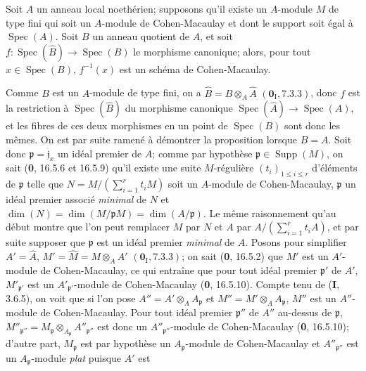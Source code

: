 \begin{proposition}[6.3.8]
\label{IV.2.s6.3.8-fr}
Soit $A$ un anneau local noethérien; supposons qu'il existe un $A$-module $M$
de type fini qui soit un $A$-module de Cohen-Macaulay et dont le support soit
égal à $\operatorname{Spec}(A)$. Soit $B$ un anneau quotient de $A$, et soit
$f:\operatorname{Spec}(\widehat B)\to\operatorname{Spec}(B)$ le morphisme
canonique; alors, pour tout $x\in\operatorname{Spec}(B)$, $f^{-1}(x)$ est un
schéma de Cohen-Macaulay.
\end{proposition}

Comme $B$ est un $A$-module de type fini, on a
$\widehat B=B\otimes_A\widehat A$ $(\mathbf{0}_{\mathrm I}, 7.3.3)$, donc $f$ est la
restriction à $\operatorname{Spec}(\widehat B)$ du morphisme canonique
$\operatorname{Spec}(\widehat A)\to\operatorname{Spec}(A)$, et les fibres de
ces deux morphismes en un point de $\operatorname{Spec}(B)$ sont donc les
mêmes. On est par suite ramené à démontrer la proposition lorsque $B=A$.
Soit donc $\mathfrak p=\mathfrak j_x$ un idéal premier de $A$; comme par
hypothèse $\mathfrak p\in\operatorname{Supp}(M)$, on sait (\textbf{0}, 16.5.6 et
16.5.9) qu'il existe une suite $M$-régulière $(t_i)_{1\leq i\leq r}$
d'éléments de $\mathfrak p$ telle que
$N=M/(\sum_{i=1}^{r}t_iM)$
soit un $A$-module de Cohen-Macaulay, $\mathfrak p$ un idéal premier associé
\emph{minimal} de $N$ et
$\dim(N)=\dim(M/\mathfrak pM)=\dim(A/\mathfrak p)$. Le même raisonnement
qu'au début montre que l'on peut remplacer $M$ par $N$ et $A$ par
$A/(\sum_{i=1}^{r}t_iA)$, et par suite supposer que $\mathfrak p$ est un
idéal premier \emph{minimal} de $A$. Posons pour simplifier
$A'=\widehat A$, $M'=\widehat M=M\otimes_AA'$ $(\mathbf{0}_{\mathrm I}, 7.3.3)$; on
sait (\textbf{0}, 16.5.2) que $M'$ est un $A'$-module de Cohen-Macaulay, ce qui entraîne
que pour tout idéal premier $\mathfrak p'$ de $A'$,
$M'_{\mathfrak p'}$ est un $A'_{\mathfrak p'}$-module de Cohen-Macaulay
(\textbf{0}, 16.5.10). Compte tenu de (\textbf{I}, 3.6.5), on voit que si l'on pose
$A''=A'\otimes_AA_{\mathfrak p}$ et
$M''=M'\otimes_AA_{\mathfrak p}$, $M''$ est un $A''$-module de
Cohen-Macaulay. Pour tout idéal premier $\mathfrak p''$ de $A''$ au-dessus
de $\mathfrak p$,
$M''_{\mathfrak p''}=M_{\mathfrak p}\otimes_{A_{\mathfrak p}}
A''_{\mathfrak p''}$ est donc un $A''_{\mathfrak p''}$-module de
Cohen-Macaulay (\textbf{0}, 16.5.10); d'autre part, $M_{\mathfrak p}$ est par hypothèse
un $A_{\mathfrak p}$-module de Cohen-Macaulay et
$A''_{\mathfrak p''}$ est un $A_{\mathfrak p}$-module \emph{plat} puisque $A'$ est
